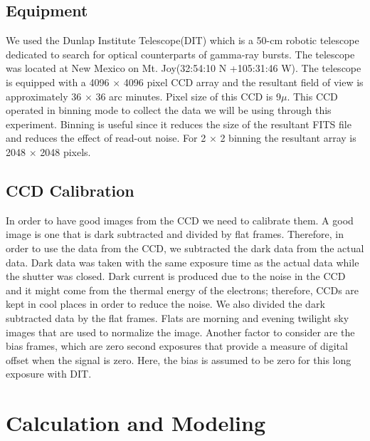 \documentclass[letterpaper,12pt]{article}
\begin{document}
\subsection{Equipment}
We used the Dunlap Institute Telescope(DIT) which is a 50-cm robotic telescope dedicated to search for optical counterparts of gamma-ray bursts. The telescope was located at New Mexico on Mt. Joy(32:54:10 N +105:31:46 W). The telescope is equipped with a 4096 \begin{math}\times\end{math} 4096 pixel CCD array and the resultant field of view is approximately 36 \begin{math}\times\end{math} 36 arc minutes. Pixel size of this CCD is 9\begin{math} \mu \end{math}. This CCD operated in binning mode to collect the data we will be using through this experiment. Binning is useful since it reduces the size of the resultant FITS file and reduces the effect of read-out noise. For 2 \begin{math}\times\end{math} 2 binning the resultant array is 2048 \begin{math}\times\end{math} 2048 pixels.

\subsection{CCD Calibration}
In order to have good images from the CCD we need to calibrate them. A good image is one that is dark subtracted and divided by flat frames. Therefore, in order to use the data from the CCD, we subtracted the dark data from the actual data. Dark data was taken with the same exposure time as the actual data while the shutter was closed. Dark current is produced due to the noise in the CCD and it might come from the thermal energy of the electrons; therefore, CCDs are kept in cool places in order to reduce the noise. We also divided the dark subtracted data by the flat frames. Flats are morning and evening twilight sky images that are used to normalize the image. Another factor to consider are the bias frames, which are zero second exposures that provide a measure of digital offset when the signal is zero. Here, the bias is assumed to be zero for this long exposure with DIT.



\section{Calculation and Modeling}
\end{document}
